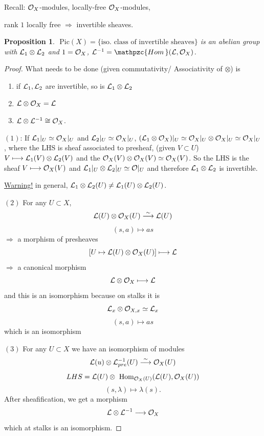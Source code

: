 \documentclass[11pt]{article}
\newtheorem{prop}[thm]{Proposition}
\renewcommand{\hom}{\text{ Hom}}
\newcommand{\phom}{\mathpzc{Hom\,}}
\newcommand{\pic}{\text{ Pic}}
\newcommand{\call}{{\cal L}}
\newcommand{\calo}{{\cal O}}
\newcommand{\Lrta}{\Longrightarrow}
\newcommand{\lrta}{\longrightarrow}
\begin{document}
Recall:
$\calo_X$-modules, locally-free $\calo_X$-modules,

rank $1$ locally free $\Lrta$ invertible sheaves.

\begin{prop}
$\pic(X)=\{\text{iso. class of  invertible sheaves}\}$ is an abelian group with $\call_1\otimes \call_2$
and $1=\calo_{X}$, $\call^{-1}=\phom(\call,\calo_X)$.
\end{prop}
\begin{proof}
What needs to be done (given commutativity/ Associativity of $\otimes$) is
\begin{enumerate}[label=(\arabic*)]
\item if $\call_1,\call_2$ are invertible, so is $\call_1\otimes \call_2$
\item $\call\otimes \calo_X=\call$
\item $\call\otimes \call^{-1}\cong \calo_X$.
\end{enumerate}

$(1)$: If $\call_1|_U\simeq \calo_X|_U$ and $\call_2|_U\simeq \calo_X|_U$,  $(\call_1\otimes\calo_X)|_U\simeq \calo_X|_U\otimes\calo_X|_U\simeq \calo_X|_U$, where the LHS is sheaf associated to presheaf, (given $V\subset U$) $V\longmapsto\call_1(V)\otimes\call_2(V)$ and the $\calo_X(V)\otimes \calo_X(V)\simeq \calo_X(V)$. So the LHS is the sheaf $V\longmapsto \calo_X(V)$ and $\call_1|_U\otimes \call_2|_U\simeq \calo|_U$ and therefore $\call_1\otimes \call_2$ is invertible.

\underline{Warning!} in general, $\call_1\otimes \call_2(U)\neq\call_1(U)\otimes\call_2(U)$.

$(2)$ For any $U\subset X$, 
$$
\call(U)\otimes\calo_X(U)\overset{\sim}{\lrta}\call(U)
$$
$$
(s,a)\longmapsto as
$$
$\Lrta $ a morphism of presheaves 
$$
[U\mapsto \call(U)\otimes\calo_X(U)]\longmapsto \call
$$
$\Lrta$  a canonical morphism
$$
\call\otimes\calo_X\longmapsto \call
$$
and this is  an isomorphism because on stalks it is 
$$
\call_x\otimes \calo_{X,x}\simeq \call_x
$$
$$
(s,a)\longmapsto as
$$
which is an isomorphism

$(3)$ For any $U\subset X$ we have an isomorphism of modules
$$
\call(u)\otimes\call^{-1}_{pre}(U)\overset{\sim}{\lrta}\calo_X(U)
$$
$$
LHS=\call(U)\otimes\hom_{\calo_X(U)}(\call(U),\calo_X(U))
$$
$$
(s,\lambda)\longmapsto \lambda(s).
$$
After sheafification, we get a morphism
$$
\call\otimes\call^{-1}\lrta \calo_X
$$
which at stalks is an isomorphism.
\end{proof}
\end{document}
